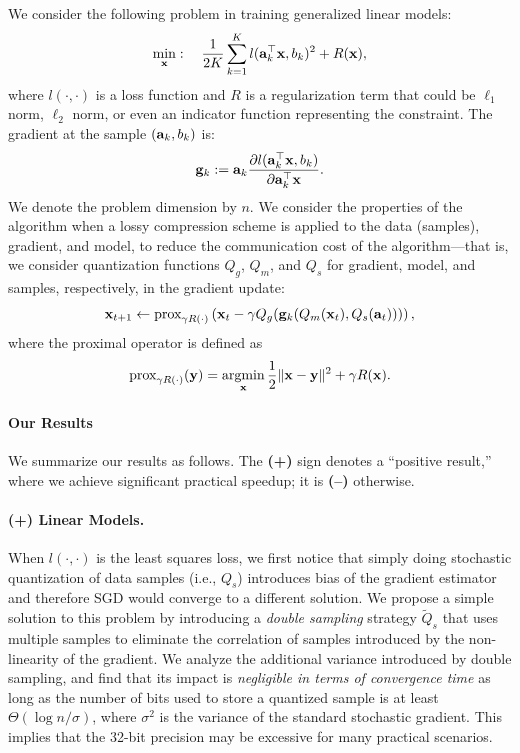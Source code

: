 \documentclass{article}
\renewcommand{\vec}[1]{\mathbf{#1}}
\def\a{{\bf a}}
\def\g{{\bf g}}
\def\x{{\bf x}}
\def\y{{\bf y}}
\DeclareMathOperator*{\argmin}{argmin}
\begin{document}
We consider the following problem in training generalized linear models: 
\begin{align}
\min_{\x}:\quad {1\over 2K}\sum_{k=1}^K l(\a_k^\top \x, b_k)^2 + R(\x),
\label{eqn:leastsquares}
\end{align}
where $l(\cdot,\cdot)$ is a loss function and $R$ is a regularization term that could be $\ell_1$ norm, $\ell_2$ norm, or even an indicator function representing the constraint. 
The gradient at the sample $(\a_k, b_k)$ is: 
\[
\g_k := \a_k \frac{\partial l(\a_k^\top \x, b_k)}{\partial \a_k^\top \x} .
\]
We denote the problem dimension by $n$. 
We consider the properties of the algorithm when a lossy compression scheme is applied to the data (samples), 
gradient, and model, to reduce the communication cost of the algorithm---that is, we consider quantization functions $Q_g$, $Q_m$, and $Q_s$ for gradient, model, and samples, respectively, in the gradient update:
\begin{align}
\x_{t + 1} \leftarrow \text{prox}_{\gamma R(\cdot)}\left(\x_t - \gamma Q_g(\g_k (Q_m(\x_t), Q_s(\vec{a}_t)))\right),
\label{eq:proxupdate}
\end{align}
where the proximal operator is defined as
\[
\text{prox}_{\gamma R(\cdot)}(\y) =\argmin_{\x} {1\over 2}\|\x-\y\|^2 + \gamma R(\x).
\]

\paragraph{Our Results} We summarize our results as follows. The {\bf (+)}
sign denotes a ``positive result,'' where we achieve
significant practical speedup; it is {\bf (--)} otherwise.

\paragraph{(+) Linear Models.} When $l(\cdot,\cdot)$ is 
the least squares loss, we first notice that
simply doing stochastic quantization of data samples  
(i.e., $Q_s$) introduces bias of the gradient
estimator and therefore SGD would converge
to a different solution. We propose a simple
solution to this problem by introducing a
{\em double sampling} strategy
$\tilde{Q}_s$ that uses multiple samples to
eliminate the correlation of samples introduced
by the non-linearity of the gradient. We
analyze the additional variance introduced
by double sampling, and find that its impact is \emph{negligible in terms of convergence time} as long as the 
number of bits used to store a quantized sample is at least $\Theta( \log n / \sigma )$, 
where $\sigma^2$ is the variance of the standard stochastic gradient. 
This implies that the 32-bit precision may be excessive for many practical scenarios. 
\end{document}
